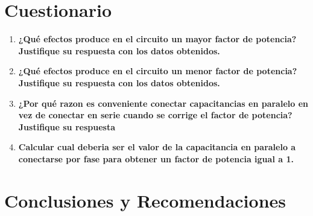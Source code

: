 \documentclass[letter,11pt]{article}
\begin{document}
\section{Cuestionario}

\begin{enumerate}

\item \textbf{¿Qué efectos produce en el circuito un mayor factor de potencia?
Justifique su respuesta con los datos obtenidos.}

\item \textbf{¿Qué efectos produce en el circuito un menor factor de potencia?
Justifique su respuesta con los datos obtenidos.}

\item \textbf{¿Por qué razon es conveniente conectar capacitancias en paralelo
en vez de conectar en serie cuando se corrige el factor de potencia? Justifique
su respuesta}

\item \textbf{Calcular cual deberia ser el valor de la capacitancia en paralelo
a conectarse por fase para obtener un factor de potencia igual a 1.}

\end{enumerate}

\section{Conclusiones y Recomendaciones}
\end{document}

